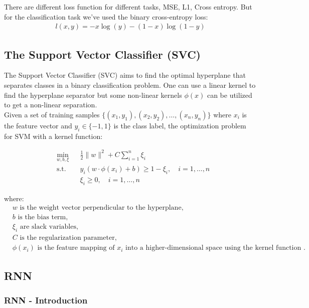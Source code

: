 \documentclass[12pt]{report}
\begin{document}
There are different loss function for different tasks, MSE, L1, Cross entropy. But for the classification task we've used the binary cross-entropy loss:
\begin{align*}
	l(x,y) = 	-x\log(y)-(1-x)\log(1-y)
\end{align*}
 


\subsection{The Support Vector Classifier (SVC)}

The Support Vector Classifier (SVC) aims to find the optimal hyperplane that separates classes in a binary classification problem. One can use a linear kernel to find the hyperplane separator but some non-linear kernels $\phi(x)$ can be utilized to get a non-linear separation.\\   

Given a set of training samples $\{(x_1, y_1), (x_2, y_2), \ldots, (x_n, y_n)\}$ where $x_i$ is the feature vector and $y_i \in \{-1, 1\}$ is the class label, the optimization problem for SVM with a kernel function:


\begin{align*}
	& \underset{w, b, \xi}{\text{min}}
	& & \frac{1}{2} \|w\|^2 + C \sum_{i=1}^{n} \xi_i \\
	& \text{s.t.}
	& & y_i (w \cdot \phi(x_i) + b) \geq 1 - \xi_i, \quad i = 1, \ldots, n \\
	& & & \xi_i \geq 0, \quad i = 1, \ldots, n
\end{align*}


where:
\begin{align*}
	&w  \text{ is the weight vector perpendicular to the hyperplane}, \\
	&b  \text{ is the bias term}, \\
	&\xi_i  \text{ are slack variables}, \\
	&C  \text{ is the regularization parameter}, \\
	&\phi(x_i)  \text{ is the feature mapping of } x_i \text{ into a higher-dimensional space using the kernel function }.
\end{align*}

\newpage
\subsection{RNN}

\subsubsection{RNN - Introduction}
\end{document}
